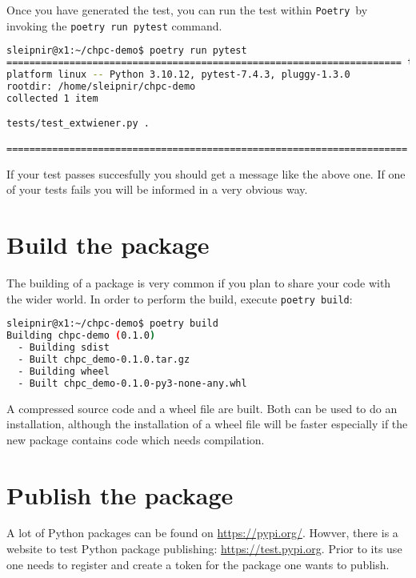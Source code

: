 \documentclass[10pt]{article}
\newcommand{\POETRY}{\texttt{Poetry}}
\begin{document}
Once you have generated the test, you can run the test within \POETRY\ by invoking the \lstinline[language=bash]{poetry run pytest} command.
\begin{lstlisting}[language=bash]
sleipnir@x1:~/chpc-demo$ poetry run pytest
===================================================================== test session starts ===================
platform linux -- Python 3.10.12, pytest-7.4.3, pluggy-1.3.0
rootdir: /home/sleipnir/chpc-demo
collected 1 item                                                                                                                                              

tests/test_extwiener.py .                                                                                                                               [100%]

====================================================================== 1 passed in 0.07s ====================
\end{lstlisting}
If your test passes succesfully you should get a message like the above one. If one of your tests fails you will be
informed in a very obvious way.


\section{Build the package}
The building of a package is very common if you plan to share your code with the wider world.
In order to perform the build, execute \texttt{poetry build}:
\begin{lstlisting}[language=bash]
sleipnir@x1:~/chpc-demo$ poetry build
Building chpc-demo (0.1.0)
  - Building sdist
  - Built chpc_demo-0.1.0.tar.gz
  - Building wheel
  - Built chpc_demo-0.1.0-py3-none-any.whl
\end{lstlisting}
A compressed source code and a wheel file are built.
Both can be used to do an installation, although the installation of a wheel file will be faster
especially if the new package contains code which needs compilation.

\section{Publish the package}
A lot of Python packages can be found on \href{https://pypi.org/}{https://pypi.org/}. 
Howver, there is a website to test Python package publishing: \href{https://test.pypi.org}{https://test.pypi.org}.
Prior to its use one needs to register and create a token for the package one wants to publish.
\end{document}
